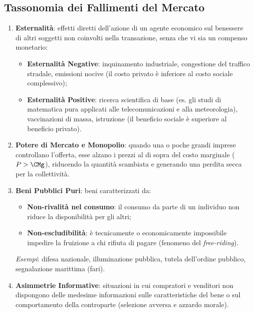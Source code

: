 \subsection{Tassonomia dei Fallimenti del Mercato}

\begin{enumerate}
    \item \textbf{Esternalità}: effetti diretti dell'azione di un agente economico sul benessere di altri soggetti non coinvolti nella transazione, senza che vi sia un compenso monetario:
    \begin{itemize}
        \item \textbf{Esternalità Negative}: inquinamento industriale, congestione del traffico stradale, emissioni nocive (il costo privato è inferiore al costo sociale complessivo);
        \item \textbf{Esternalità Positive}: ricerca scientifica di base (es. gli studi di matematica pura applicati alle telecomunicazioni e alla meteorologia), vaccinazioni di massa, istruzione (il beneficio sociale è superiore al beneficio privato).
    \end{itemize}
    
    \item \textbf{Potere di Mercato e Monopolio}: quando una o poche grandi imprese controllano l'offerta, esse alzano i prezzi al di sopra del costo marginale ($P > \CMg$), riducendo la quantità scambiata e generando una perdita secca per la collettività.
    
    \item \textbf{Beni Pubblici Puri}: beni caratterizzati da:
    \begin{itemize}
        \item \textbf{Non-rivalità nel consumo}: il consumo da parte di un individuo non riduce la disponibilità per gli altri;
        \item \textbf{Non-escludibilità}: è tecnicamente o economicamente impossibile impedire la fruizione a chi rifiuta di pagare (fenomeno del \textit{free-riding}).
    \end{itemize}
    \textit{Esempi}: difesa nazionale, illuminazione pubblica, tutela dell'ordine pubblico, segnalazione marittima (fari).
    
    \item \textbf{Asimmetrie Informative}: situazioni in cui compratori e venditori non dispongono delle medesime informazioni sulle caratteristiche del bene o sul comportamento della controparte (selezione avversa e azzardo morale).
\end{enumerate}

